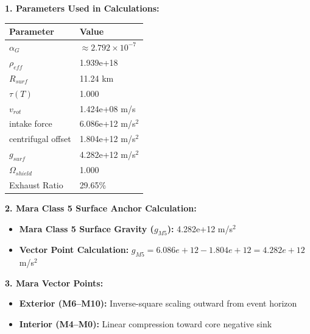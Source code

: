 \documentclass[11pt, a4paper]{article}
\begin{document}
\vspace{0.5em}
\noindent \textbf{1. Parameters Used in Calculations:}
\begin{center}
  \begin{tabular}{|l|l|}
    \hline
    \textbf{Parameter} & \textbf{Value} \\ \hline
    $\alpha_G$ & $\approx 2.792 \times 10^{-7}$ \\ \hline
    $\rho_{eff}$ & 1.939e+18 \\ \hline
    $R_{surf}$ & 11.24 km \\ \hline
    $\tau(T)$ & 1.000 \\ \hline
    $v_{rot}$ & 1.424e+08 m/s \\ \hline
    intake force & 6.086e+12 m/s$^2$ \\ \hline
    centrifugal offset & 1.804e+12 m/s$^2$ \\ \hline
    $g_{surf}$ & 4.282e+12 m/s$^2$ \\ \hline
    $\Omega_{shield}$ & 1.000 \\ \hline
    Exhaust Ratio & 29.65\% \\ \hline
  \end{tabular}
\end{center}

\vspace{0.5em}
\noindent \textbf{2. Mara Class 5 Surface Anchor Calculation:}
\begin{itemize}
  \item \textbf{Mara Class 5 Surface Gravity ($g_{M5}$):} 4.282e+12 m/s$^2$
  \item \textbf{Vector Point Calculation:} $g_{M5} = 6.086e+12 - 1.804e+12 = 4.282e+12$ m/s$^2$
\end{itemize}

\vspace{0.5em}
\noindent \textbf{3. Mara Vector Points:}
\begin{itemize}
  \item \textbf{Exterior (M6--M10):} Inverse-square scaling outward from event horizon
  \item \textbf{Interior (M4--M0):} Linear compression toward core negative sink
\end{itemize}
\end{document}
